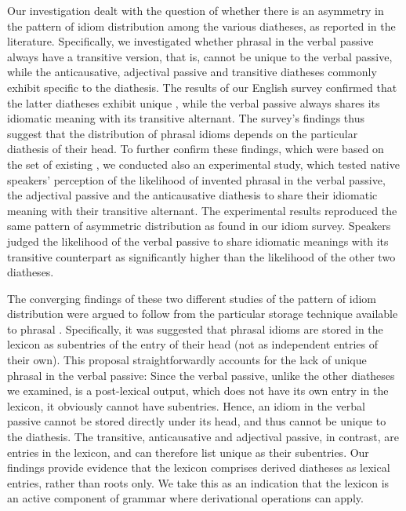\documentclass[output=paper]{langsci/langscibook}
\begin{document}
Our investigation dealt with the question of whether there is an asymmetry in
the pattern of idiom distribution among the various diatheses, as reported in
the literature. Specifically, we investigated whether phrasal  in the
verbal passive always have a transitive version, that is, cannot be unique to
the verbal passive, while the anticausative, adjectival passive and transitive
diatheses commonly exhibit  specific to the diathesis. The results of our
English survey confirmed that the latter diatheses exhibit unique , while
the verbal passive always shares its idiomatic meaning with its transitive
alternant. The survey’s findings thus suggest that the distribution of phrasal
idioms depends on the particular diathesis of their head. To further confirm
these findings, which were based on the set of existing , we conducted
also an experimental study, which tested native speakers’ perception of the
likelihood of invented phrasal  in the verbal passive, the adjectival
passive and the anticausative diathesis to share their idiomatic meaning with
their transitive alternant. The experimental results reproduced the same
pattern of asymmetric distribution as found in our idiom survey. Speakers
judged the likelihood of the verbal passive to share idiomatic meanings with
its transitive counterpart as significantly higher than the likelihood of the
other two diatheses.

The converging findings of these two different studies of the pattern of idiom
distribution were argued to follow from the particular storage technique
available to phrasal . Specifically, it was suggested that phrasal idioms
are stored in the lexicon as subentries of the entry of their head (not as
independent entries of their own). This proposal straightforwardly accounts for
the lack of unique phrasal  in the verbal passive: Since the verbal
passive, unlike the other diatheses we examined, is a post-lexical output,
which does not have its own entry in the lexicon, it obviously cannot have
subentries. Hence, an idiom in the verbal passive cannot be stored directly
under its head, and thus cannot be unique to the diathesis. The transitive,
anticausative and adjectival passive, in contrast, are entries in the lexicon,
and can therefore list unique  as their subentries. Our findings provide
evidence that the lexicon comprises derived diatheses as lexical entries,
rather than roots only. We take this as an indication that the lexicon is an
active component of grammar where derivational operations can apply.
\end{document}
